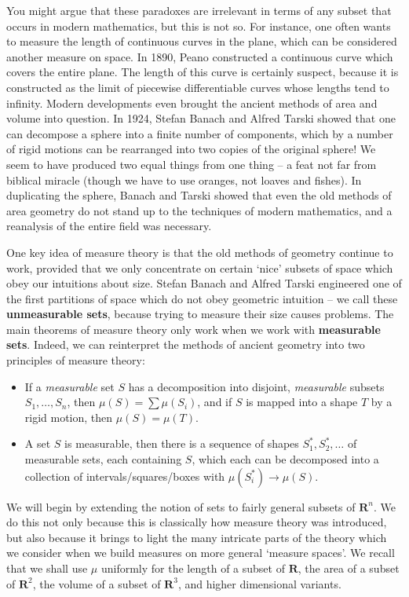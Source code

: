 You might argue that these paradoxes are irrelevant in terms of any subset that occurs in modern mathematics, but this is not so. For instance, one often wants to measure the length of continuous curves in the plane, which can be considered another measure on space. In 1890, Peano constructed a continuous curve which covers the entire plane. The length of this curve is certainly suspect, because it is constructed as the limit of piecewise differentiable curves whose lengths tend to infinity. Modern developments even brought the ancient methods of area and volume into question. In 1924, Stefan Banach and Alfred Tarski showed that one can decompose a sphere into a finite number of components, which by a number of rigid motions can be rearranged into two copies of the original sphere! We seem to have produced two equal things from one thing -- a feat not far from biblical miracle (though we have to use oranges, not loaves and fishes). In duplicating the sphere, Banach and Tarski showed that even the old methods of area geometry do not stand up to the techniques of modern mathematics, and a reanalysis of the entire field was necessary.

One key idea of measure theory is that the old methods of geometry continue to work, provided that we only concentrate on certain `nice' subsets of space which obey our intuitions about size. Stefan Banach and Alfred Tarski engineered one of the first partitions of space which do not obey geometric intuition -- we call these {\bf unmeasurable sets}, because trying to measure their size causes problems. The main theorems of measure theory only work when we work with {\bf measurable sets}. Indeed, we can reinterpret the methods of ancient geometry into two principles of measure theory:
%
\begin{itemize}
    \item If a {\it measurable} set $S$ has a decomposition into disjoint, {\it measurable} subsets $S_1, \dots, S_n$, then $\mu(S) = \sum \mu(S_i)$, and if $S$ is mapped into a shape $T$ by a rigid motion, then $\mu(S) = \mu(T)$.

    \item A set $S$ is measurable, then there is a sequence of shapes $S^*_1, S^*_2, \dots$ of measurable sets, each containing $S$, which each can be decomposed into a collection of intervals/squares/boxes with $\mu(S^*_i) \to \mu(S)$.
\end{itemize}

We will begin by extending the notion of sets to fairly general subsets of $\mathbf{R}^n$. We do this not only because this is classically how measure theory was introduced, but also because it brings to light the many intricate parts of the theory which we consider when we build measures on more general `measure spaces'. We recall that we shall use $\mu$ uniformly for the length of a subset of $\mathbf{R}$, the area of a subset of $\mathbf{R}^2$, the volume of a subset of $\mathbf{R}^3$, and higher dimensional variants.

